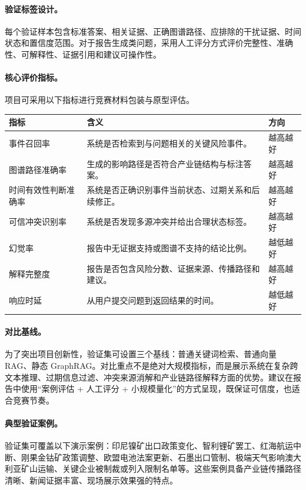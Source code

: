 ﻿\documentclass[12pt,a4paper]{article}
\begin{document}
\paragraph{验证标签设计。}每个验证样本包含标准答案、相关证据、正确图谱路径、应排除的干扰证据、时间状态和置信度范围。对于报告生成类问题，采用人工评分方式评价完整性、准确性、可解释性、证据引用和建议可操作性。

\paragraph{核心评价指标。}项目可采用以下指标进行竞赛材料包装与原型评估。
\begin{longtable}{p{}p{}p{}}
\toprule
\textbf{指标} & \textbf{含义} & \textbf{方向} \\
\midrule
事件召回率 & 系统是否检索到与问题相关的关键风险事件。 & 越高越好 \\
图谱路径准确率 & 生成的影响路径是否符合产业链结构与标注答案。 & 越高越好 \\
时间有效性判断准确率 & 系统是否正确识别事件当前状态、过期关系和后续修正。 & 越高越好 \\
可信冲突识别率 & 系统是否发现多源冲突并给出合理状态标签。 & 越高越好 \\
幻觉率 & 报告中无证据支持或图谱不支持的结论比例。 & 越低越好 \\
解释完整度 & 报告是否包含风险分数、证据来源、传播路径和建议。 & 越高越好 \\
响应时延 & 从用户提交问题到返回结果的时间。 & 越低越好 \\
\bottomrule
\end{longtable}

\paragraph{对比基线。}为了突出项目创新性，验证集可设置三个基线：普通关键词检索、普通向量 RAG、静态 GraphRAG。对比重点不是绝对大规模指标，而是展示系统在复杂跨文本推理、过期信息过滤、冲突来源消解和产业链路径解释方面的优势。建议在报告中使用“案例评估 + 人工评分 + 小规模量化”的方式呈现，既保证可信度，也适合竞赛节奏。

\paragraph{典型验证案例。}验证集可覆盖以下演示案例：印尼镍矿出口政策变化、智利锂矿罢工、红海航运中断、刚果金钴矿政策调整、欧盟电池法案更新、石墨出口管制、极端天气影响澳大利亚矿山运输、关键企业被制裁或列入限制名单等。这些案例具备产业链传播路径清晰、新闻证据丰富、现场展示效果强的特点。
\end{document}
